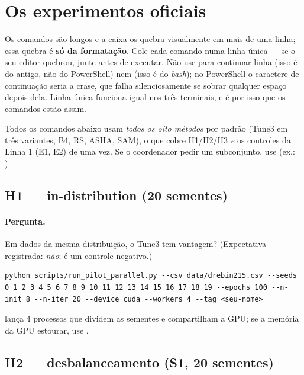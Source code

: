 \section{Os experimentos oficiais}

\begin{alerta}
Os comandos são longos e a caixa os quebra visualmente em mais de uma linha; essa quebra é \textbf{só da formatação}. Cole cada comando numa linha única --- se o seu editor quebrou, junte antes de executar. Não use \code{\^{}} para continuar linha (isso é do  antigo, não do PowerShell) nem \code{\textbackslash} (isso é do \emph{bash}); no PowerShell o caractere de continuação seria a crase, que falha silenciosamente se sobrar qualquer espaço depois dela. Linha única funciona igual nos três terminais, e é por isso que os comandos estão assim.
\end{alerta}

Todos os comandos abaixo usam \emph{todos os oito métodos} por padrão (Tune3 em três variantes, B4, RS, ASHA, SAM), o que cobre H1/H2/H3 \emph{e} os controles da Linha 1 (E1, E2) de uma vez. Se o coordenador pedir um subconjunto, use  (ex.: ).

\subsection{H1 --- in-distribution (20 sementes)}\label{sec:h1}
\paragraph{Pergunta.} Em dados da mesma distribuição, o Tune3 tem vantagem? (Expectativa registrada: \emph{não}; é um controle negativo.)
\begin{lstlisting}
python scripts/run_pilot_parallel.py --csv data/drebin215.csv --seeds 0 1 2 3 4 5 6 7 8 9 10 11 12 13 14 15 16 17 18 19 --epochs 100 --n-init 8 --n-iter 20 --device cuda --workers 4 --tag <seu-nome>
\end{lstlisting}
 lança 4 processos que dividem as sementes e compartilham a GPU; se a memória da GPU estourar, use .

\subsection{H2 --- desbalanceamento (S1, 20 sementes)}
